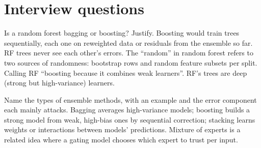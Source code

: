 \section{Interview questions}

\begin{qa}{ Is a random forest bagging or boosting? Justify.}
\why Boosting would train trees sequentially, each one on reweighted data or residuals from the ensemble so far. RF trees never see
each other's errors. The ``random'' in random forest refers to two sources of randomness: bootstrap rows and random feature subsets
per split.
\pitfall Calling RF ``boosting because it combines weak learners''. RF's trees are deep (strong but high-variance) learners.
\end{qa}

\begin{qa}{ Name the types of ensemble methods, with an example and the error component each mainly
attacks.}
\why Bagging averages high-variance models; boosting builds a strong model from weak, high-bias ones by sequential correction;
stacking learns weights or interactions between models' predictions. Mixture of experts is a related idea where a gating
model chooses which expert to trust per input.
\end{qa}

